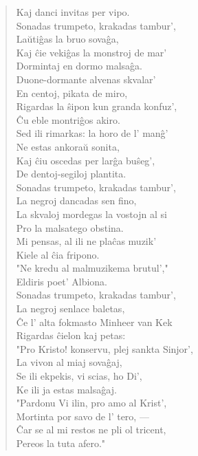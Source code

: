 \begin{verse}
                 Kaj danci invitas per vipo.\\
                 \vin   Sonadas trumpeto, krakadas tambur',\\
                 La\u uti\^gas la bruo sova\^ga,\\
                 Kaj \^cie veki\^gas la monstroj de mar'\\
                 Dormintaj en dormo malsa\^ga.\\
                  \vin  Duone-dormante alvenas skvalar'\\
                 En centoj, pikata de miro,\\
                 Rigardas la \^sipon kun granda konfuz',\\
                 \^Cu eble montri\^gos akiro.\\
                  \vin  Sed ili rimarkas: la horo de l' man\^g'\\
                 Ne estas ankora\u u sonita,\\
                 Kaj \^ciu oscedas per lar\^ga bu\^seg',\\
                 De dentoj-segiloj plantita.\\
                 \vin   Sonadas trumpeto, krakadas tambur',\\
                 La negroj dancadas sen fino,\\
                 La skvaloj mordegas la vostojn al si\\
                 Pro la malsatego obstina.\\
                 \vin   Mi pensas, al ili ne pla\^cas muzik'\\
                 Kiele al \^cia fripono.\\
                 "Ne kredu al malmuzikema brutul',"\\
                 Eldiris poet' Albiona.\\
                 \vin   Sonadas trumpeto, krakadas tambur',\\
                 La negroj senlace baletas,\\
                 \^Ce l' alta fokmasto Minheer van Kek\\
                 Rigardas \^cielon kaj petas:\\
                 \vin   "Pro Kristo! konservu, plej sankta Sinjor',\\
                 La vivon al miaj sova\^gaj,\\
                 Se ili ekpekis, vi scias, ho Di',\\
                 Ke ili ja estas malsa\^gaj.\\
                 \vin   "Pardonu Vi ilin, pro amo al Krist',\\
                 Mortinta por savo de l' tero, ---\\
                 \^Car se al mi restos ne pli ol tricent,\\
                 Pereos la tuta afero."

\end{verse}


\smallrule{}

